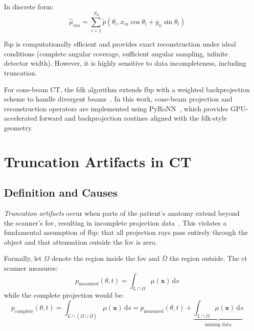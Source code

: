 In discrete form:
%
\begin{equation}
\hat{\mu}_{mn} = \sum_{i=1}^{N_\theta} \tilde{p}(\theta_i, x_m\cos\theta_i + y_n\sin\theta_i)
\label{eq:fbp_discrete}
\end{equation}

\gls{fbp} is computationally efficient and provides exact reconstruction under ideal conditions (complete angular coverage, sufficient angular sampling, infinite detector width). However, it is highly sensitive to data incompleteness, including truncation.

For cone-beam CT, the \gls{fdk} algorithm extends \gls{fbp} with a weighted backprojection scheme to handle divergent beams~\cite{feldkamp1984practical}. In this work, cone-beam projection and reconstruction operators are implemented using PyRoNN~\cite{syben2019pyronn}, which provides GPU-accelerated forward and backprojection routines aligned with the \gls{fdk}-style geometry.

\section{Truncation Artifacts in CT}

\subsection{Definition and Causes}

\textit{Truncation artifacts} occur when parts of the patient's anatomy extend beyond the scanner's \gls{fov}, resulting in incomplete projection data~\cite{ohnesorge2000efficient, hsieh2015computed}. This violates a fundamental assumption of \gls{fbp}: that all projection rays pass entirely through the object and that attenuation outside the \gls{fov} is zero.

Formally, let $\Omega$ denote the region inside the \gls{fov} and $\bar{\Omega}$ the region outside. The \gls{ct} scanner measures:
%
\begin{equation}
p_{\text{measured}}(\theta, t) = \int_{L \cap \Omega} \mu(\mathbf{x}) \, \mathrm{d}s
\end{equation}
%
while the complete projection would be:
%
\begin{equation}
p_{\text{complete}}(\theta, t) = \int_{L \cap (\Omega \cup \bar{\Omega})} \mu(\mathbf{x}) \, \mathrm{d}s = p_{\text{measured}}(\theta, t) + \underbrace{\int_{L \cap \bar{\Omega}} \mu(\mathbf{x}) \, \mathrm{d}s}_{\text{missing data}}
\end{equation}

